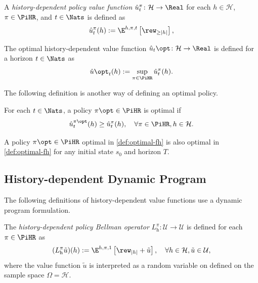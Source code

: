 \begin{definition} \label{def:u-pi}
A \emph{history-dependent policy value function} $\hat{u}^{\pi}_t\colon \mathcal{H} \to \Real$ for each $h\in \mathcal{H}$, $\pi \in \PiHR$, and $t\in \Nats$ is defined as
  \[
   \hat{u}^{\pi}_t(h) := \E^{h, \pi, t} \left[ \rew_{\ge |h|} \right],
 \]
\end{definition}


\begin{definition}
The optimal history-dependent value function $\hat{u}_t\opt\colon \mathcal{H} \to \Real$ is defined for a horizon $t\in \Nats$ as
 \[
  \hat{u}\opt_t(h) := \sup_{\pi\in \PiHR} \hat{u}_t^{\pi}(h). 
 \] 
\end{definition}

The following definition is another way of defining an optimal policy.
\begin{definition} \label{def:optimal-fh}
For each $t\in \Nats$, a policy $\pi\opt \in \PiHR$ is optimal if
\[
   \hat{u}_t^{\pi\opt}(h) \ge \hat{u}_t^{\pi}(h), \quad \forall \pi \in \PiHR, h\in \mathcal{H}.
 \]
\end{definition}

\begin{theorem} \label{def:optimalvf-imp-optimal}
A policy $\pi\opt \in \PiHR$ optimal in \cref{def:optimal-fh} is also optimal in \cref{def:optimal-fh} for any initial state $s_0$ and horizon $T$.
\end{theorem}

\subsection{History-dependent Dynamic Program}

The following definitions of history-dependent value functions use a dynamic program formulation.

\begin{definition} \label{def:DPhpi}
The \emph{history-dependent policy Bellman operator} $L_{\mathrm{h}}^{\pi} \colon \mathcal{U} \to \mathcal{U}$ is defined for each $\pi\in \PiHR$ as
  \[
    (L_{\mathrm{h}}^{\pi} \tilde{u}) (h)
    :=
    \E^{h, \pi, 1} \left[ \rew_{|h|} + \tilde{u} \right], \quad \forall h\in \mathcal{H}, \tilde{u} \in \mathcal{U},
  \]
  where the value function $\tilde{u}$ is interpreted as a random variable on defined on the sample space $\Omega = \mathcal{H}$.
\end{definition}

